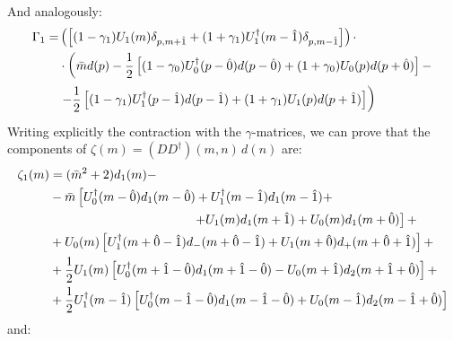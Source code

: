 And analogously: 
\begin{equation*}
    \begin{split}
        \Gamma_1 = & \left( \left[ (1 - \gamma_1) U_1(m) \delta_{p, m+\hat{1}} + (1 + \gamma_1) U_1^\dagger (m - \hat{1}) \delta_{p, m - \hat{1}} \right]\right) \cdot \\
       & \cdot \left( \Bar{m} d(p) - \frac{1}{2}\left[ (1 - \gamma_0) U_0^\dagger(p - \hat{0}) d(p-\hat{0}) + (1 + \gamma_0) U_0 (p) d(p+\hat{0}) \right] - \right. \\ 
       & \left. - \frac{1}{2}\left[ (1 - \gamma_1) U_1^\dagger(p - \hat{1}) d(p-\hat{1}) + (1 + \gamma_1) U_1 (p) d(p+\hat{1}) \right] \right)
    \end{split}
\end{equation*}
Writing explicitly the contraction with the $\gamma$-matrices, we can prove that the components of $\zeta (m) = (DD^\dagger)(m,n) \, d(n)$ are:
\begin{equation*}
    \begin{split}
     \zeta_1(m) &= (\Bar{m}^2 + 2) d_1 (m) - \\
     & - \Bar{m} \left[ U_0^\dagger(m - \hat{0}) d_1(m - \hat{0}) + U_1^\dagger(m - \hat{1}) d_1(m-\hat{1}) + \right. \\ 
     & \hspace{40 mm} \left. + U_1(m) d_1(m + \hat{1}) + U_0 (m) d_1(m + \hat{0})  \right] + \\
     & + U_0 (m) \left[ U_1^\dagger(m + \hat{0} - \hat{1}) d_-(m + \hat{0} - \hat{1}) + U_1(m + \hat{0}) d_+(m + \hat{0} + \hat{1}) \right] + \\ 
     & + \frac{1}{2} U_1 (m) \left[ U_0^\dagger(m + \hat{1} - \hat{0}) d_1(m + \hat{1} - \hat{0}) - U_0(m + \hat{1}) d_2(m + \hat{1} + \hat{0}) \right] +  \\ 
     & + \frac{1}{2} U_1^\dagger (m - \hat{1}) \left[ U_0^\dagger(m - \hat{1} - \hat{0}) d_1(m - \hat{1} - \hat{0}) + U_0(m - \hat{1}) d_2(m - \hat{1} + \hat{0}) \right] \\ 
    \end{split}
\end{equation*}
and: 
